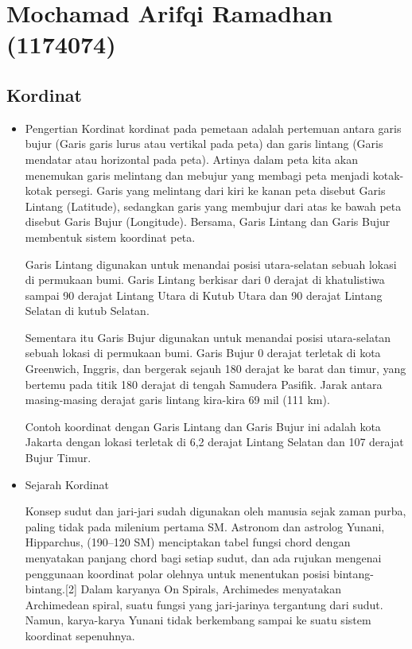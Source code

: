 \section{Mochamad Arifqi Ramadhan (1174074)}
\subsection{Kordinat}
\begin{itemize}
	\item Pengertian Kordinat
	kordinat pada pemetaan adalah pertemuan antara garis bujur (Garis garis lurus atau vertikal pada peta) dan garis lintang (Garis mendatar atau horizontal pada peta). Artinya dalam peta kita akan menemukan garis melintang dan mebujur yang membagi peta menjadi kotak-kotak persegi.
Garis yang melintang dari kiri ke kanan peta disebut Garis Lintang (Latitude), sedangkan garis yang membujur dari atas ke bawah peta disebut Garis Bujur (Longitude).
Bersama, Garis Lintang dan Garis Bujur membentuk sistem koordinat peta.

Garis Lintang digunakan untuk menandai posisi utara-selatan sebuah lokasi di permukaan bumi. Garis Lintang berkisar dari 0 derajat di khatulistiwa sampai 90 derajat Lintang Utara di Kutub Utara dan 90 derajat Lintang Selatan di kutub Selatan.

Sementara itu Garis Bujur digunakan untuk menandai posisi utara-selatan sebuah lokasi di permukaan bumi. Garis Bujur 0 derajat terletak di kota Greenwich, Inggris, dan bergerak sejauh 180 derajat ke barat dan timur, yang bertemu pada titik 180 derajat di tengah Samudera Pasifik. Jarak antara masing-masing derajat garis lintang kira-kira 69 mil (111 km).

Contoh koordinat dengan Garis Lintang dan Garis Bujur ini adalah kota Jakarta dengan lokasi terletak di 6,2 derajat Lintang Selatan dan 107 derajat Bujur Timur.

\item Sejarah Kordinat
	
Konsep sudut dan jari-jari sudah digunakan oleh manusia sejak zaman purba, paling tidak pada milenium pertama SM. Astronom dan astrolog Yunani, Hipparchus, (190–120 SM) menciptakan tabel fungsi chord dengan menyatakan panjang chord bagi setiap sudut, dan ada rujukan mengenai penggunaan koordinat polar olehnya untuk menentukan posisi bintang-bintang.[2] Dalam karyanya On Spirals, Archimedes menyatakan Archimedean spiral, suatu fungsi yang jari-jarinya tergantung dari sudut. Namun, karya-karya Yunani tidak berkembang sampai ke suatu sistem koordinat sepenuhnya.


\end{itemize}
